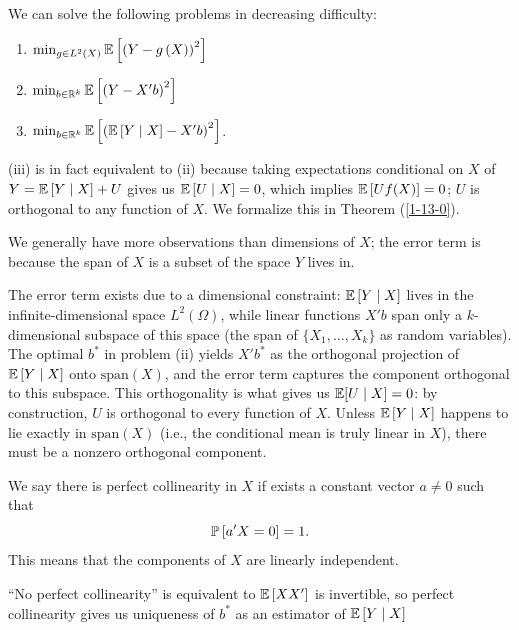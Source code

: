 \begin{remark}	We can solve the following problems in decreasing difficulty:
	\begin{enumerate}[label=(\roman*)]
		\item $\min_{g \in L^2(X)} \E\left[\left(Y - g\left(X \right)\right)^2\right] $
		\item $\min_{b \in \R^k} \E\left[\left(Y - X'b\right)^2\right] $
		\item $\min_{b \in \R^k} \E\left[\left(\E\left[Y \mid X\right] - X'b\right)^2\right] $.
	\end{enumerate}

	(iii) is in fact equivalent to (ii) because taking expectations conditional on $X$ of $Y = \E\left[Y \mid X \right]  + U$ gives us $\E\left[U \mid X\right] =0$, which implies $\E\left[Uf(X)\right] = 0$; $U$ is orthogonal to any function of $X$. We formalize this in Theorem (\ref{1-13-0}).

	We generally have more observations than dimensions of $X$; the error term is because the span of $X$ is a subset of the space $Y$ lives in.

		The error term exists due to a dimensional constraint: $\E\left[Y \mid X \right]$ lives in the infinite-dimensional space $L^2(\Omega)$, while linear functions $X'b$ span only a $k$-dimensional subspace of this space (the span of $\{X_1, \ldots, X_k\}$ as random variables). The optimal $b^*$ in problem (ii) yields $X'b^*$ as the orthogonal projection of $\E\left[Y \mid X \right]$ onto $\text{span}(X)$, and the error term captures the component orthogonal to this subspace. This orthogonality is what gives us $\E[U \mid X] = 0$: by construction, $U$ is orthogonal to every function of $X$. Unless $\E\left[Y \mid X \right]$ happens to lie exactly in $\text{span}(X)$ (i.e., the conditional mean is truly linear in $X$), there must be a nonzero orthogonal component.
\end{remark}

\begin{definition}
	We say there is perfect collinearity in $X$ if exists a constant vector $a \ne 0$ such that \[
		\P\left[a' X = 0\right] = 1
		.\] This means that the components of $X$ are linearly independent.

	``No perfect collinearity'' is equivalent to $\E\left[XX'\right] $ is invertible, so perfect collinearity gives us uniqueness of $b^*$ as an estimator of $\E\left[Y \mid X\right]$
\end{definition}


